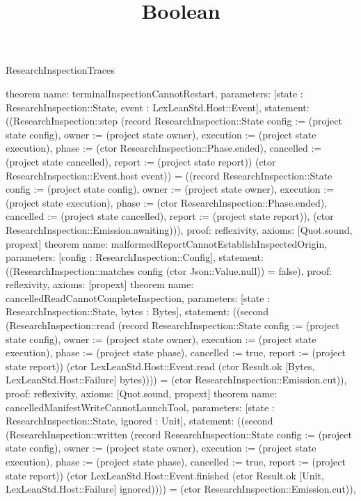\begin{lexlean}{ResearchInspectionTraces}
\title{Boolean}
\begin{semanticmodule}
theorem{
 name: terminalInspectionCannotRestart,
 parameters: [state : ResearchInspection::State, event : LexLeanStd.Host::Event],
 statement: ((ResearchInspection::step (record ResearchInspection::State {config := (project state config), owner := (project state owner), execution := (project state execution), phase := (ctor ResearchInspection::Phase.ended), cancelled := (project state cancelled), report := (project state report)}) (ctor ResearchInspection::Event.host event)) = ((record ResearchInspection::State {config := (project state config), owner := (project state owner), execution := (project state execution), phase := (ctor ResearchInspection::Phase.ended), cancelled := (project state cancelled), report := (project state report)}), (ctor ResearchInspection::Emission.awaiting))),
 proof: reflexivity{},
 axioms: [Quot.sound, propext]
}
theorem{
 name: malformedReportCannotEstablishInspectedOrigin,
 parameters: [config : ResearchInspection::Config],
 statement: ((ResearchInspection::matches config (ctor Json::Value.null)) = false),
 proof: reflexivity{},
 axioms: [propext]
}
theorem{
 name: cancelledReadCannotCompleteInspection,
 parameters: [state : ResearchInspection::State, bytes : Bytes],
 statement: ((second (ResearchInspection::read (record ResearchInspection::State {config := (project state config), owner := (project state owner), execution := (project state execution), phase := (project state phase), cancelled := true, report := (project state report)}) (ctor LexLeanStd.Host::Event.read (ctor Result.ok [Bytes, LexLeanStd.Host::Failure] bytes)))) = (ctor ResearchInspection::Emission.cut)),
 proof: reflexivity{},
 axioms: [Quot.sound, propext]
}
theorem{
 name: cancelledManifestWriteCannotLaunchTool,
 parameters: [state : ResearchInspection::State, ignored : Unit],
 statement: ((second (ResearchInspection::written (record ResearchInspection::State {config := (project state config), owner := (project state owner), execution := (project state execution), phase := (project state phase), cancelled := true, report := (project state report)}) (ctor LexLeanStd.Host::Event.finished (ctor Result.ok [Unit, LexLeanStd.Host::Failure] ignored)))) = (ctor ResearchInspection::Emission.cut)),
}
\end{semanticmodule}
\end{lexlean}
